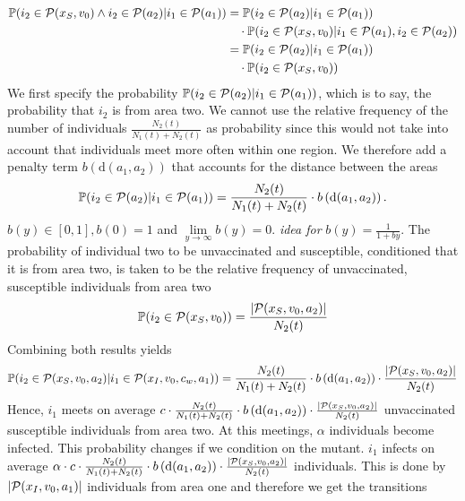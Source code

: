 \begin{align*}
\mathbb{P}(i_2 \in \mathcal{P}(x_S, v_0) \wedge i_2 \in \mathcal{P}(a_2) | i_1 \in \mathcal{P}(a_1)) &= \mathbb{P}(i_2 \in \mathcal{P}(a_2) | i_1 \in \mathcal{P}(a_1) )  \notag \\
& \quad \cdot \mathbb{P}(i_2 \in \mathcal{P}(x_S, v_0) | i_1 \in \mathcal{P}(a_1), i_2 \in \mathcal{P}(a_2) ) \notag \\
&= \mathbb{P}(i_2 \in \mathcal{P}(a_2) | i_1 \in \mathcal{P}(a_1) )  \notag \\
& \quad \cdot \mathbb{P}(i_2 \in \mathcal{P}(x_S, v_0))
\end{align*} 
We first specify the probability $\mathbb{P}(i_2 \in \mathcal{P}(a_2) | i_1 \in \mathcal{P}(a_1) )$, which is to say, the probability that $i_2$ is from area two. We cannot use the relative frequency of the number of individuals $\frac{N_{2}(t)}{N_1(t) + N_2(t)}$ as probability since this would not take into account that individuals meet more often within one region. We therefore add a penalty term $b\left(\text{d}(a_1, a_2) \right)$ that accounts for the distance between the areas
\begin{align*}
\mathbb{P}(i_2 \in \mathcal{P}(a_2) | i_1 \in \mathcal{P}(a_1) ) = \frac{N_{2}(t)}{N_1(t) + N_2(t)} \cdot b\left(\text{d}(a_1, a_2) \right).
\end{align*}
$b(y) \in [0,1], b\left(0\right) = 1$ and $\lim\limits_{y \to \infty} b\left(y\right) = 0$. \textit{idea for} $b(y)= \frac{1}{1 + b y}$.
The probability of individual two to be unvaccinated and susceptible, conditioned that it is from area two, is taken to be the relative frequency of unvaccinated, susceptible individuals from area two
\begin{align*}
\mathbb{P}(i_2 \in \mathcal{P}(x_S, v_0)) = \frac{|\mathcal{P}(x_S, v_0, a_2)|}{N_2(t)}
\end{align*}
Combining both results yields
\begin{align*}
\mathbb{P}(i_2 \in \mathcal{P}(x_S, v_0 ,a_2)|i_1 \in \mathcal{P}(x_I, v_0,c_w, a_1)) = \frac{N_{2}(t)}{N_1(t) + N_2(t)} \cdot b\left(\text{d}(a_1, a_2) \right) \cdot \frac{|\mathcal{P}(x_S, v_0, a_2)|}{N_2(t)}
\end{align*}
Hence, $i_1$ meets on average $c \cdot \frac{N_{2}(t)}{N_1(t) + N_2(t)} \cdot b\left(\text{d}(a_1, a_2) \right) \cdot \frac{|\mathcal{P}(x_S, v_0, a_2)|}{N_2(t)}$ unvaccinated susceptible individuals from area two. At this meetings, $\alpha$ individuals become infected. This probability changes if we condition on the mutant. $i_1$ infects on average $\alpha \cdot c \cdot \frac{N_{2}(t)}{N_1(t) + N_2(t)} \cdot b\left(\text{d}(a_1, a_2) \right) \cdot \frac{|\mathcal{P}(x_S, v_0, a_2)|}{N_2(t)} $ individuals. This is done by $|\mathcal{P}(x_I, v_0, a_1)|$ individuals from area one and therefore we get the transitions 
